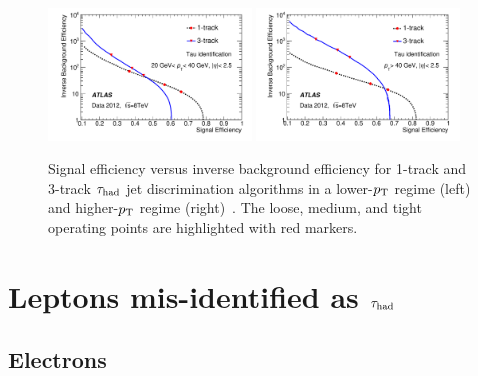 \begin{figure}[tp]
  \centering
  \includegraphics[width=0.48\textwidth]{figures/PERF-2013-06/fig_05a}
  \includegraphics[width=0.48\textwidth]{figures/PERF-2013-06/fig_05b}
  \caption{Signal efficiency versus inverse background efficiency for 1-track and 3-track $\tau_\text{had}$ jet discrimination algorithms in a lower-$p_{\mathrm{T}}$ regime (left) and higher-$p_{\mathrm{T}}$ regime (right)~\cite{PERF-2013-06}. The loose, medium, and tight operating points are highlighted with red markers.}
  \label{fig:taus-idroc}
\end{figure}

\section{Leptons mis-identified as $\tau_\text{had}$}
\label{sec:taus-leptonfakes}

\subsection{Electrons}



